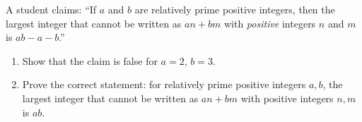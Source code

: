 A student claims: ``If $a$ and $b$ are relatively prime positive integers, then the largest integer that cannot be written as $an+bm$ with \emph{positive} integers $n$ and $m$ is $ab-a-b$.''
\begin{enumerate}
\item[(a)] Show that the claim is false for $a=2$, $b=3$.
\item[(b)] Prove the correct statement: for relatively prime positive integers $a,b$, the largest integer that cannot be written as $an+bm$ with positive integers $n,m$ is $ab$.
\end{enumerate}
